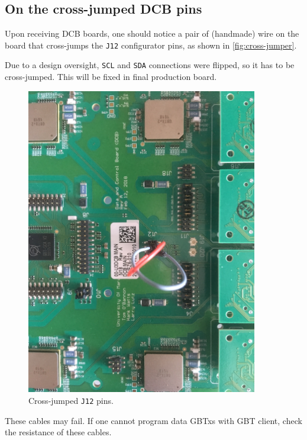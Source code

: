 \subsection{On the cross-jumped DCB pins}
\label{appx:cross-jumper}
Upon receiving DCB boards, one should notice a pair of (handmade) wire on the
board that cross-jumps the \texttt{J12} configurator pins, as shown in
\autoref{fig:cross-jumper}.

Due to a design oversight, \texttt{SCL} and \texttt{SDA} connections were
flipped, so it has to be cross-jumped.
This will be fixed in final production board.

\begin{figure}[ht]
    \centering
    \includegraphics[width=0.9\textwidth]{res/cross_jumper.jpg}
    \caption{Cross-jumped \texttt{J12} pins.}
    \label{fig:cross-jumper}
\end{figure}

\begin{leftbar}
    These cables may fail.
    If one cannot program data GBTxs with GBT client, check the resistance of
    these cables.
\end{leftbar}
